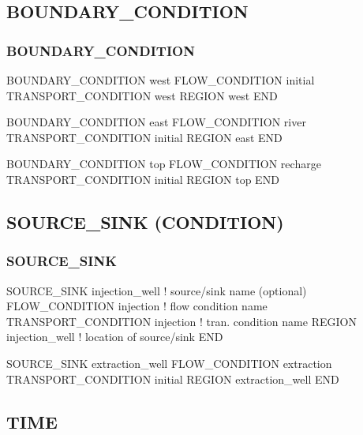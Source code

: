\documentclass{beamer}
\newcommand\bluecomment[1]{{{\color{blue} #1}}}
\begin{document}
\subsection{BOUNDARY\_CONDITION}

\begin{frame}\frametitle{BOUNDARY\_CONDITION}

\small
\begin{semiverbatim}
BOUNDARY_CONDITION west
  FLOW_CONDITION initial
  TRANSPORT_CONDITION west
  REGION west
END

BOUNDARY_CONDITION east
  FLOW_CONDITION river
  TRANSPORT_CONDITION initial
  REGION east
END

BOUNDARY_CONDITION top
  FLOW_CONDITION recharge
  TRANSPORT_CONDITION initial
  REGION top
END
\end{semiverbatim}

\end{frame}

\subsection{SOURCE\_SINK (CONDITION)}

\begin{frame}\frametitle{SOURCE\_SINK}

\begin{semiverbatim}
SOURCE_SINK injection_well   \bluecomment{! source/sink name (optional)}
  FLOW_CONDITION injection       \bluecomment{! flow condition name}
  TRANSPORT_CONDITION injection  \bluecomment{! tran. condition name}
  REGION injection_well        \bluecomment{! location of source/sink}
END

SOURCE_SINK extraction_well
  FLOW_CONDITION extraction
  TRANSPORT_CONDITION initial
  REGION extraction_well
END
\end{semiverbatim}

\end{frame}

\subsection{TIME}
\end{document}
